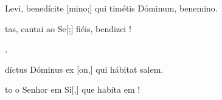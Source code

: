 {  {\item {} Levi, benedícite [mino;] qui timétis Dóminum, benemino.~\Antiphona}%
    {\item {}tas, cantai ao Se[;] fiéis, bendizei !~\Antiphona},
  {\item {}díctus Dóminus ex [on,] qui hábitat \-sa\-lem.~\Antiphona}%
    {\item {}to o Senhor em Si[,] que habita em !~\Antiphona}
}